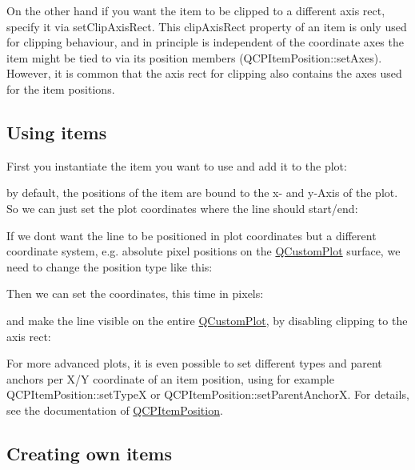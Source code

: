 On the other hand if you want the item to be clipped to a different axis rect, specify it via set\+Clip\+Axis\+Rect. This clip\+Axis\+Rect property of an item is only used for clipping behaviour, and in principle is independent of the coordinate axes the item might be tied to via its position members (Q\+C\+P\+Item\+Position\+::set\+Axes). However, it is common that the axis rect for clipping also contains the axes used for the item positions.\hypertarget{class_q_c_p_abstract_item_items-using}{}\subsection{Using items}\label{class_q_c_p_abstract_item_items-using}
First you instantiate the item you want to use and add it to the plot\+: 
\begin{DoxyCodeInclude}
\end{DoxyCodeInclude}
by default, the positions of the item are bound to the x-\/ and y-\/\+Axis of the plot. So we can just set the plot coordinates where the line should start/end\+: 
\begin{DoxyCodeInclude}
\end{DoxyCodeInclude}
If we don\textquotesingle{}t want the line to be positioned in plot coordinates but a different coordinate system, e.\+g. absolute pixel positions on the \mbox{\hyperlink{class_q_custom_plot}{Q\+Custom\+Plot}} surface, we need to change the position type like this\+: 
\begin{DoxyCodeInclude}
\end{DoxyCodeInclude}
Then we can set the coordinates, this time in pixels\+: 
\begin{DoxyCodeInclude}
\end{DoxyCodeInclude}
and make the line visible on the entire \mbox{\hyperlink{class_q_custom_plot}{Q\+Custom\+Plot}}, by disabling clipping to the axis rect\+: 
\begin{DoxyCodeInclude}
\end{DoxyCodeInclude}
 For more advanced plots, it is even possible to set different types and parent anchors per X/Y coordinate of an item position, using for example Q\+C\+P\+Item\+Position\+::set\+TypeX or Q\+C\+P\+Item\+Position\+::set\+Parent\+AnchorX. For details, see the documentation of \mbox{\hyperlink{class_q_c_p_item_position}{Q\+C\+P\+Item\+Position}}.\hypertarget{class_q_c_p_abstract_item_items-subclassing}{}\subsection{Creating own items}\label{class_q_c_p_abstract_item_items-subclassing}
